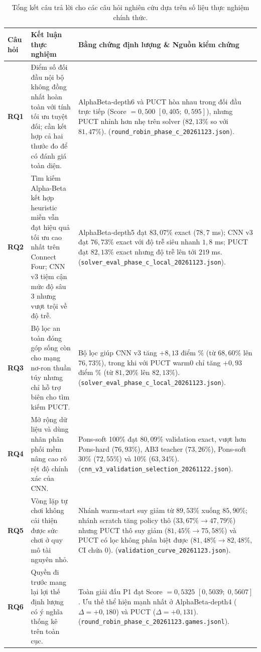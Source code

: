 \documentclass[11pt, a4paper]{article}
\begin{document}
\begin{table}[H]
    \centering
    \small
    \caption{Tổng kết câu trả lời cho các câu hỏi nghiên cứu dựa trên số liệu thực nghiệm chính thức.}
    \label{tab:rq_final_summary}
    \begin{tabular}{@{} l p{5.0cm} p{7.0cm} @{}}
        \toprule
        \textbf{Câu hỏi} & \textbf{Kết luận thực nghiệm} & \textbf{Bằng chứng định lượng \& Nguồn kiểm chứng} \\
        \midrule
        \textbf{RQ1} & Điểm số đối đầu nội bộ không đồng nhất hoàn toàn với tính tối ưu tuyệt đối; cần kết hợp cả hai thước đo để có đánh giá toàn diện. & AlphaBeta-depth6 và PUCT hòa nhau trong đối đầu trực tiếp (Score $= 0{,}500$ $[0{,}405;\; 0{,}595]$), nhưng PUCT nhỉnh hơn nhẹ trên solver ($82{,}13\%$ so với $81{,}47\%$). (\texttt{round\_robin\_phase\_c\_20261123.json}). \\
        \addlinespace[3pt]
        \textbf{RQ2} & Tìm kiếm Alpha-Beta kết hợp heuristic miền vẫn đạt hiệu quả tối ưu cao nhất trên Connect Four; CNN v3 tiệm cận mức độ sâu 3 nhưng vượt trội về độ trễ. & AlphaBeta-depth5 đạt $83{,}07\%$ exact ($78{,}7$ ms); CNN v3 đạt $76{,}73\%$ exact với độ trễ siêu nhanh $1{,}8$ ms; PUCT đạt $82{,}13\%$ exact nhưng độ trễ lên tới $219$ ms. (\texttt{solver\_eval\_phase\_c\_local\_20261123.json}). \\
        \addlinespace[3pt]
        \textbf{RQ3} & Bộ lọc an toàn đóng góp sống còn cho mạng nơ-ron thuần túy nhưng chỉ hỗ trợ biên cho tìm kiếm PUCT. & Bộ lọc giúp CNN v3 tăng $+8{,}13$ điểm \% (từ $68{,}60\%$ lên $76{,}73\%$), trong khi với PUCT warm0 chỉ tăng $+0{,}93$ điểm \% (từ $81{,}20\%$ lên $82{,}13\%$). (\texttt{solver\_eval\_phase\_c\_local\_20261123.json}). \\
        \addlinespace[3pt]
        \textbf{RQ4} & Mở rộng dữ liệu và dùng nhãn phân phối mềm nâng cao rõ rệt độ chính xác của CNN. & Pons-soft 100\% đạt $80{,}09\%$ validation exact, vượt hơn Pons-hard ($76{,}93\%$), AB3 teacher ($73{,}26\%$), Pons-soft 30\% ($72{,}55\%$) và 10\% ($63{,}34\%$). (\texttt{cnn\_v3\_validation\_selection\_20261122.json}). \\
        \addlinespace[3pt]
        \textbf{RQ5} & Vòng lặp tự chơi không cải thiện được sức chơi ở quy mô tài nguyên nhỏ. & Nhánh warm-start suy giảm từ $89{,}53\%$ xuống $85{,}90\%$; nhánh scratch tăng policy thô ($33{,}67\% \to 47{,}79\%$) nhưng PUCT thô suy giảm ($81{,}45\% \to 75{,}58\%$) và PUCT có lọc không phân biệt được ($81{,}48\% \to 82{,}48\%$, CI chứa 0). (\texttt{validation\_curve\_20261123.json}). \\
        \addlinespace[3pt]
        \textbf{RQ6} & Quyền đi trước mang lại lợi thế định lượng có ý nghĩa thống kê trên toàn cục. & Toàn giải đấu P1 đạt Score $= 0{,}5325$ $[0{,}5039;\; 0{,}5607]$. Ưu thế thể hiện mạnh nhất ở AlphaBeta-depth4 ($\Delta = +0{,}180$) và PUCT ($\Delta = +0{,}131$). (\texttt{round\_robin\_phase\_c\_20261123.games.jsonl}). \\
        \bottomrule
    \end{tabular}
\end{table}
\end{document}
